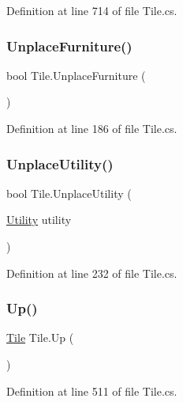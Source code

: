 Definition at line 714 of file Tile.\+cs.

\mbox{\label{class_tile_a47e3946def991a9751ebb485d7f2f28b}} 
\subsubsection{\texorpdfstring{Unplace\+Furniture()}{UnplaceFurniture()}}
{\footnotesize\ttfamily bool Tile.\+Unplace\+Furniture (\begin{DoxyParamCaption}{ }\end{DoxyParamCaption})}



Definition at line 186 of file Tile.\+cs.

\mbox{\label{class_tile_abfcc2e84347bbb279e288f0d1c995567}} 
\subsubsection{\texorpdfstring{Unplace\+Utility()}{UnplaceUtility()}}
{\footnotesize\ttfamily bool Tile.\+Unplace\+Utility (\begin{DoxyParamCaption}\item[{\hyperlink{class_utility}{Utility}}]{utility }\end{DoxyParamCaption})}



Definition at line 232 of file Tile.\+cs.

\mbox{\label{class_tile_a2edba7e7456c987ed34a9f67bb9277b9}} 
\subsubsection{\texorpdfstring{Up()}{Up()}}
{\footnotesize\ttfamily \hyperlink{class_tile}{Tile} Tile.\+Up (\begin{DoxyParamCaption}{ }\end{DoxyParamCaption})}



Definition at line 511 of file Tile.\+cs.

\mbox{\label{class_tile_afbff4f028a2b8f7a0c58726aa75aed82}} 
